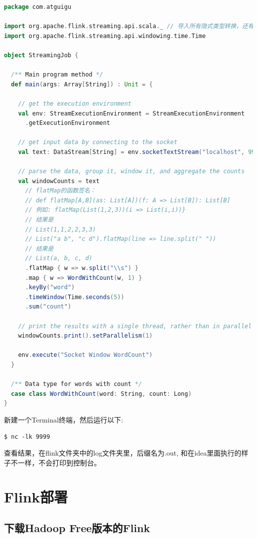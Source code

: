 \documentclass[oneside]{ctexbook}
\begin{document}
\begin{lstlisting}[language=scala, caption=StreamingJob.scala, escapechar=ß]
package com.atguigu

import org.apache.flink.streaming.api.scala._ // 导入所有隐式类型转换，还有其他类
import org.apache.flink.streaming.api.windowing.time.Time

object StreamingJob {

  /** Main program method */
  def main(args: Array[String]) : Unit = {

    // get the execution environment
    val env: StreamExecutionEnvironment = StreamExecutionEnvironment
      .getExecutionEnvironment

    // get input data by connecting to the socket
    val text: DataStream[String] = env.socketTextStream("localhost", 9999, '\n')

    // parse the data, group it, window it, and aggregate the counts
    val windowCounts = text
      // flatMap的函数签名：
      // def flatMap[A,B](as: List[A])(f: A => List[B]): List[B]
      // 例如: flatMap(List(1,2,3))(i => List(i,i))}
      // 结果是
      // List(1,1,2,2,3,3)
      // List("a b", "c d").flatMap(line => line.split(" "))
      // 结果是
      // List(a, b, c, d)
      .flatMap { w => w.split("\\s") }
      .map { w => WordWithCount(w, 1) }
      .keyBy("word")
      .timeWindow(Time.seconds(5))
      .sum("count")

    // print the results with a single thread, rather than in parallel
    windowCounts.print().setParallelism(1)

    env.execute("Socket Window WordCount")
  }

  /** Data type for words with count */
  case class WordWithCount(word: String, count: Long)
}
\end{lstlisting}

新建一个Terminal终端，然后运行以下:

\begin{lstlisting}
$ nc -lk 9999
\end{lstlisting}

查看结果，在flink文件夹中的log文件夹里，后缀名为\colorbox{gray!20}{.out}, 和在idea里面执行的样子不一样，不会打印到控制台。 

\section{Flink部署}

\subsection{下载Hadoop Free版本的Flink}
\end{document}
